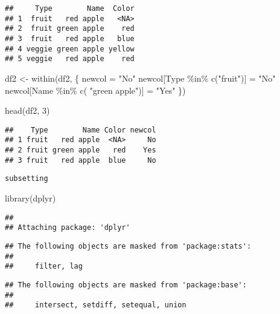\documentclass[
]{book}
\newenvironment{Shaded}{\begin{snugshade}}{\end{snugshade}}
\newcommand{\DecValTok}[1]{\textcolor[rgb]{0.00,0.00,0.81}{#1}}
\newcommand{\FunctionTok}[1]{\textcolor[rgb]{0.00,0.00,0.00}{#1}}
\newcommand{\NormalTok}[1]{#1}
\newcommand{\OtherTok}[1]{\textcolor[rgb]{0.56,0.35,0.01}{#1}}
\newcommand{\SpecialCharTok}[1]{\textcolor[rgb]{0.00,0.00,0.00}{#1}}
\newcommand{\StringTok}[1]{\textcolor[rgb]{0.31,0.60,0.02}{#1}}
\begin{document}
\begin{verbatim}
##     Type        Name  Color
## 1  fruit   red apple   <NA>
## 2  fruit green apple    red
## 3  fruit   red apple   blue
## 4 veggie green apple yellow
## 5 veggie   red apple    red
\end{verbatim}

\begin{Shaded}
\begin{Highlighting}[]
\NormalTok{df2 }\OtherTok{\textless{}{-}} \FunctionTok{within}\NormalTok{(df2, }
\NormalTok{              \{ newcol }\OtherTok{=} \StringTok{"No"}
\NormalTok{              newcol[Type }\SpecialCharTok{\%in\%} \FunctionTok{c}\NormalTok{(}\StringTok{"fruit"}\NormalTok{)] }\OtherTok{=} \StringTok{"No"}
\NormalTok{              newcol[Name }\SpecialCharTok{\%in\%} \FunctionTok{c}\NormalTok{( }\StringTok{"green apple"}\NormalTok{)] }\OtherTok{=} \StringTok{"Yes"}
\NormalTok{\})}

\FunctionTok{head}\NormalTok{(df2, }\DecValTok{3}\NormalTok{)}
\end{Highlighting}
\end{Shaded}

\begin{verbatim}
##    Type        Name Color newcol
## 1 fruit   red apple  <NA>     No
## 2 fruit green apple   red    Yes
## 3 fruit   red apple  blue     No
\end{verbatim}

\texttt{subsetting}

\begin{Shaded}
\begin{Highlighting}[]
\FunctionTok{library}\NormalTok{(dplyr)}
\end{Highlighting}
\end{Shaded}

\begin{verbatim}
## 
## Attaching package: 'dplyr'
\end{verbatim}

\begin{verbatim}
## The following objects are masked from 'package:stats':
## 
##     filter, lag
\end{verbatim}

\begin{verbatim}
## The following objects are masked from 'package:base':
## 
##     intersect, setdiff, setequal, union
\end{verbatim}

\begin{Shaded}
\end{Shaded}
\end{document}
